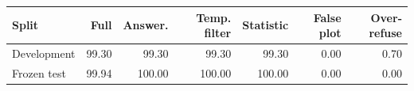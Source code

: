 \begin{tabular}{lrrrrrr}
\toprule
Split & Full & Answer. & Temp. filter & Statistic & False plot & Over-refuse \\
\midrule
Development & 99.30 & 99.30 & 99.30 & 99.30 & 0.00 & 0.70 \\
Frozen test & 99.94 & 100.00 & 100.00 & 100.00 & 0.00 & 0.00 \\
\bottomrule
\end{tabular}
